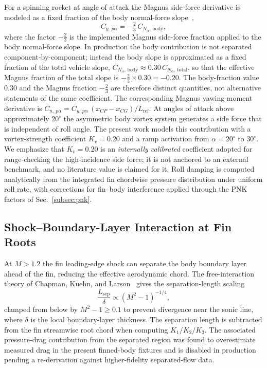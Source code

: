 For a spinning rocket at angle of attack the Magnus side-force
derivative is modeled as a fixed fraction of the body normal-force
slope~\cite{platou1965},
%
\begin{equation}
C_{y,\,p\alpha} = -\tfrac{2}{3}\,C_{N_\alpha,\,\mathrm{body}},
\label{eq:magnus}
\end{equation}
%
where the factor $-\tfrac{2}{3}$ is the implemented Magnus side-force
fraction applied to the body normal-force slope. In production the body
contribution is not separated component-by-component; instead the body
slope is approximated as a fixed fraction of the total vehicle slope,
$C_{N_\alpha,\,\mathrm{body}} \approx 0.30\,C_{N_\alpha,\,\mathrm{total}}$,
so that the effective Magnus fraction of the total slope is
$-\tfrac{2}{3}\times 0.30 = -0.20$. The body-fraction value $0.30$ and
the Magnus fraction $-\tfrac{2}{3}$ are therefore distinct quantities,
not alternative statements of the same coefficient. The corresponding
Magnus yawing-moment derivative is
$C_{n,\,p\alpha} = C_{y,\,p\alpha}\,(x_{CP} - x_{CG})/L_{\mathrm{ref}}$.
At angles of attack above approximately $20^\circ$ the asymmetric body
vortex system generates a side force that is independent of roll angle.
The present work models this contribution with a vortex-strength
coefficient $K_v = 0.20$ and a ramp activation from $\alpha = 20^\circ$
to $30^\circ$. We emphasize that $K_v = 0.20$ is an
\emph{internally calibrated} coefficient adopted for range-checking the
high-incidence side force; it is not anchored to an external benchmark,
and no literature value is claimed for it. Roll damping is computed
analytically from the integrated fin chordwise pressure distribution
under uniform roll rate, with corrections for fin--body interference
applied through the PNK factors of Sec.~\ref{subsec:pnk}.

\subsection{Shock--Boundary-Layer Interaction at Fin Roots}
\label{subsec:sbli}

At $M > 1.2$ the fin leading-edge shock can separate the body boundary
layer ahead of the fin, reducing the effective aerodynamic chord. The
free-interaction theory of Chapman, Kuehn, and
Larson~\cite{chapman1958} gives the separation-length scaling
%
\begin{equation}
\frac{L_{\mathrm{sep}}}{\delta} \propto (M^2 - 1)^{-1/4},
\label{eq:sbli}
\end{equation}
%
clamped from below by $M^2 - 1 \geq 0.1$ to prevent divergence near the
sonic line, where $\delta$ is the local boundary-layer thickness. The
separation length is subtracted from the fin streamwise root chord when
computing $K_1/K_2/K_3$. The associated pressure-drag contribution from
the separated region was found to overestimate measured drag in the
present finned-body fixtures and is disabled in production pending a
re-derivation against higher-fidelity separated-flow data.
